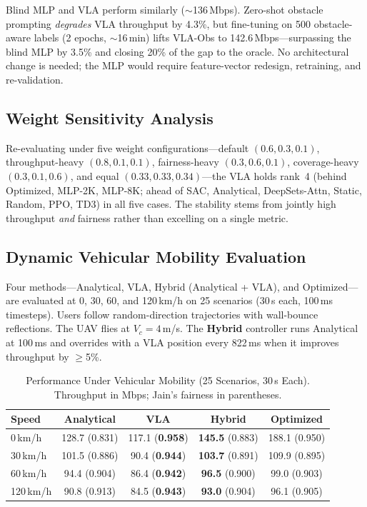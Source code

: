 \documentclass[journal]{IEEEtran}
\begin{document}
Blind MLP and VLA perform similarly (${\sim}$136\,Mbps). Zero-shot obstacle prompting \emph{degrades} VLA throughput by 4.3\%, but fine-tuning on 500 obstacle-aware labels (2 epochs, ${\sim}$16\,min) lifts VLA-Obs to 142.6\,Mbps---surpassing the blind MLP by 3.5\% and closing 20\% of the gap to the oracle. No architectural change is needed; the MLP would require feature-vector redesign, retraining, and re-validation.


\subsection{Weight Sensitivity Analysis}
\label{sec:weight_sensitivity}

Re-evaluating under five weight configurations---default $(0.6, 0.3, 0.1)$, throughput-heavy $(0.8, 0.1, 0.1)$, fairness-heavy $(0.3, 0.6, 0.1)$, coverage-heavy $(0.3, 0.1, 0.6)$, and equal $(0.33, 0.33, 0.34)$---the VLA holds rank~4 (behind Optimized, MLP-2K, MLP-8K; ahead of SAC, Analytical, DeepSets-Attn, Static, Random, PPO, TD3) in all five cases. The stability stems from jointly high throughput \emph{and} fairness rather than excelling on a single metric.


\subsection{Dynamic Vehicular Mobility Evaluation}
\label{sec:mobility}

Four methods---Analytical, VLA, Hybrid (Analytical + VLA), and Optimized---are evaluated at 0, 30, 60, and 120\,km/h on 25 scenarios (30\,s each, 100\,ms timesteps). Users follow random-direction trajectories with wall-bounce reflections. The UAV flies at $V_c{=}4$\,m/s. The \textbf{Hybrid} controller runs Analytical at 100\,ms and overrides with a VLA position every 822\,ms when it improves throughput by $\geq$5\%.

\begin{table}[!t]
    \centering
    \caption{Performance Under Vehicular Mobility (25 Scenarios, 30\,s Each). Throughput in Mbps; Jain's fairness in parentheses.}
    \label{tab:mobility}
    \footnotesize
    \begin{tabular}{@{}l@{\hskip 4pt}c@{\hskip 4pt}c@{\hskip 4pt}c@{\hskip 4pt}c@{}}
        \toprule
        \textbf{Speed} & \textbf{Analytical} & \textbf{VLA} & \textbf{Hybrid} & \textbf{Optimized} \\
        \midrule
        0\,km/h & 128.7 (0.831) & 117.1 (\textbf{0.958}) & \textbf{145.5} (0.883) & 188.1 (0.950) \\
        30\,km/h & 101.5 (0.886) & 90.4 (\textbf{0.944}) & \textbf{103.7} (0.891) & 109.9 (0.895) \\
        60\,km/h & 94.4 (0.904) & 86.4 (\textbf{0.942}) & \textbf{96.5} (0.900) & 99.0 (0.903) \\
        120\,km/h & 90.8 (0.913) & 84.5 (\textbf{0.943}) & \textbf{93.0} (0.904) & 96.1 (0.905) \\
        \bottomrule
    \end{tabular}
\end{table}
\end{document}
